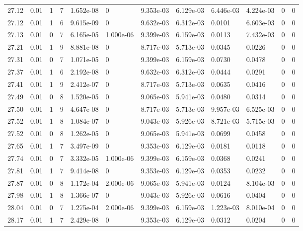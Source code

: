 \documentclass[preview]{standalone}
\begin{document}
{{{{{{{{{{\begin{tabular}{L{1.2cm}C{1.2cm} C{0.3cm}C{0.5cm} C{1.4cm}C{1.4cm} C{1.4cm}C{1.4cm} C{1.6cm}C{1.6cm} C{1.6cm}C{1.6cm}}
  27.12  &  0.01  & 1     &  7 &  1.652e-08  & 0  &  9.353e-03&   6.129e-03& 6.446e-03 & 4.224e-03   &  0 & 0  \\ 
  27.12  &  0.01  & 1     &  6 &  9.615e-09  & 0  &  9.632e-03&   6.312e-03& 0.0101 & 6.603e-03   &  0 & 0  \\ 
  27.13  &  0.01  & 0     &  7 &  6.165e-05  & 1.000e-06  &  9.399e-03&   6.159e-03& 0.0113 & 7.432e-03   &  0 & 0  \\ 
  27.21  &  0.01  & 1     &  9 &  8.881e-08  & 0  &  8.717e-03&   5.713e-03& 0.0345 & 0.0226   &  0 & 0  \\ 
  27.31  &  0.01  & 0     &  7 &  1.071e-05  & 0  &  9.399e-03&   6.159e-03& 0.0730 & 0.0478   &  0 & 0  \\ 
  27.37  &  0.01  & 1     &  6 &  2.192e-08  & 0  &  9.632e-03&   6.312e-03& 0.0444 & 0.0291   &  0 & 0  \\ 
  27.41  &  0.01  & 1     &  9 &  2.412e-07  & 0  &  8.717e-03&   5.713e-03& 0.0635 & 0.0416   &  0 & 0  \\ 
  27.49  &  0.01  & 0     &  8 &  1.520e-05  & 0  &  9.065e-03&   5.941e-03& 0.0480 & 0.0314   &  0 & 0  \\ 
  27.50  &  0.01  & 1     &  9 &  4.647e-08  & 0  &  8.717e-03&   5.713e-03& 9.957e-03 & 6.525e-03   &  0 & 0  \\ 
  27.52  &  0.01  & 1     &  8 &  1.084e-07  & 0  &  9.043e-03&   5.926e-03& 8.721e-03 & 5.715e-03   &  0 & 0  \\ 
  27.52  &  0.01  & 0     &  8 &  1.262e-05  & 0  &  9.065e-03&   5.941e-03& 0.0699 & 0.0458   &  0 & 0  \\ 
  27.65  &  0.01  & 1     &  7 &  3.497e-09  & 0  &  9.353e-03&   6.129e-03& 0.0181 & 0.0118   &  0 & 0  \\ 
  27.74  &  0.01  & 0     &  7 &  3.332e-05  & 1.000e-06  &  9.399e-03&   6.159e-03& 0.0368 & 0.0241   &  0 & 0  \\ 
  27.81  &  0.01  & 1     &  7 &  9.414e-08  & 0  &  9.353e-03&   6.129e-03& 0.0353 & 0.0232   &  0 & 0  \\ 
  27.87  &  0.01  & 0     &  8 &  1.172e-04  & 2.000e-06  &  9.065e-03&   5.941e-03& 0.0124 & 8.104e-03   &  0 & 0  \\ 
  27.98  &  0.01  & 1     &  8 &  1.366e-07  & 0  &  9.043e-03&   5.926e-03& 0.0616 & 0.0404   &  0 & 0  \\ 
  28.04  &  0.01  & 0     &  7 &  1.275e-04  & 2.000e-06  &  9.399e-03&   6.159e-03& 1.223e-03 & 8.010e-04   &  0 & 0  \\ 
  28.17  &  0.01  & 1     &  7 &  2.429e-08  & 0  &  9.353e-03&   6.129e-03& 0.0312 & 0.0204   &  0 & 0  \\ 

\end{tabular}}}}}}}}}}}
\end{document}
